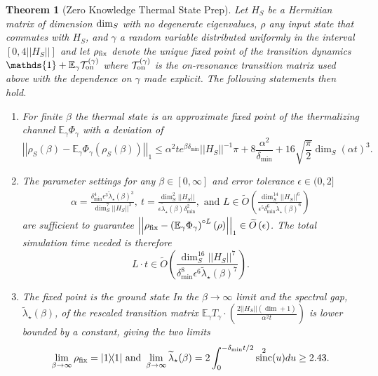 \documentclass[
 amsmath,amssymb,
 aps,
onecolumn, 
nofootinbib]{revtex4-2}
\newtheorem{theorem}{Theorem}
\newcommand{\on}{\rm on}
\newcommand{\ketbra}[2]{| #1\rangle\! \langle #2|}
\newcommand{\norm}[1]{\left|\left| #1 \right|\right|}
\newcommand{\EE}{\mathbb{E}}
\newcommand{\TT}{\mathcal{T}}
\newcommand{\bigotilde}[1]{\widetilde{O} \left( #1 \right)}
\newcommand{\identity}{\mathds{1}}
\DeclareMathOperator{\sinc}{sinc}
\begin{document}
\begin{theorem}[Zero Knowledge Thermal State Prep] \label{thm:zero_knowledge}
    Let $H_S$ be a Hermitian matrix of dimension ${\rm dim}_S$ with no degenerate eigenvalues, $\rho$ any input state that commutes with $H_S$, and $\gamma$ a random variable distributed uniformly in the interval $[0, 4 \norm{H_S}]$ and
    let $\rho_{\rm fix}$ denote the unique fixed point of the transition dynamics $\identity + \EE_\gamma \TT_{\on}^{(\gamma)}$ where $\TT_{\on}^{(\gamma)}$ is the on-resonance transition matrix used above with the dependence on $\gamma$ made explicit. The following statements then hold.
    \begin{enumerate}
\item For finite $\beta$ the thermal state is an approximate fixed point of the thermalizing channel $\EE_\gamma \Phi_\gamma$ with a deviation of
    \begin{equation}
        \norm{\rho_S(\beta) - \EE_\gamma \Phi_\gamma(\rho_S(\beta))}_1 \le \alpha^2 t e^{\beta \delta_{\min}} \norm{H_S}^{-1} \pi + 8 \frac{\alpha^2}{\delta_{\min}} + 16 \sqrt{\frac{\pi}{2}} \dim_S (\alpha t)^3.
    \end{equation}
    \item   The parameter settings for any $\beta\in [0,\infty]$ and error tolerance $\epsilon \in (0,2]$
    \begin{align}
        \alpha = \frac{\delta_{\min}^4 \epsilon^{3} \widetilde{\lambda}_\star(\beta)^{3}}{\dim_S^7 \norm{H_S}^3}, ~t = \frac{\dim_S^2 \norm{H_S}}{\epsilon \widetilde{\lambda}_\star(\beta) \delta_{\min}^2}, \text{ and } L \in \bigotilde{\frac{\dim_S^{14} \norm{H_S}^6}{\epsilon^5 \delta_{\min}^6 \widetilde{\lambda}_\star(\beta)^{6} }}
    \end{align}
    are sufficient to guarantee $\norm{\rho_{\rm fix} - \left(\EE_\gamma \Phi_\gamma \right)^{\circ L}(\rho)}_1 \in \bigotilde{\epsilon}$.
    The total simulation time needed is therefore
    \begin{equation}
        L \cdot t \in \bigotilde{\frac{\dim_S^{16} \norm{H_S}^7}{\delta_{\min}^8 \epsilon^6 \widetilde{\lambda}_\star(\beta)^7}}.
    \end{equation}
   \item    The fixed point is the ground state In the $\beta \to \infty$ limit and the spectral gap, $\widetilde{\lambda}_\star(\beta)$, of the rescaled transition matrix $\EE_\gamma T_\gamma \cdot \left(\frac{2 \norm{H_S} (\dim + 1)}{\alpha^2 t}\right)$ is lower bounded by a constant, giving the two limits
    \begin{equation}
        \lim_{\beta \to \infty} \rho_{\rm fix} = \ketbra{1}{1} \text{ and } \lim_{\beta \to \infty} \widetilde{\lambda}_\star(\beta) = 2 \int_{0}^{-\delta_{\min}t/2} \sinc^2(u) du \ge 2.43.
        \end{equation}

    \end{enumerate}
\end{theorem}
\end{document}
